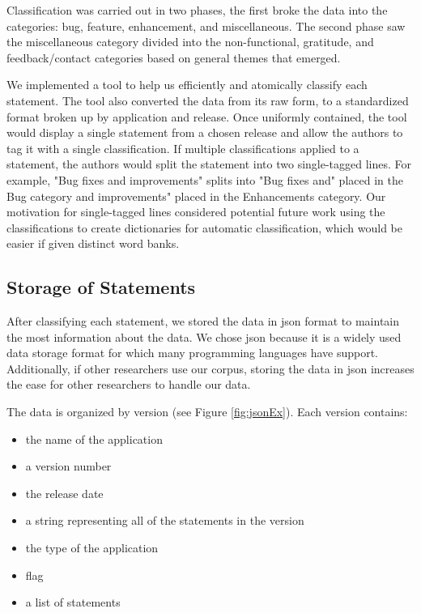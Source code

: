 \documentclass{acm_proc_article-sp}
\begin{document}
Classification was carried out in two phases, the first broke the data into the categories: bug, feature, enhancement, and miscellaneous.
The second phase saw the miscellaneous category divided into the non-functional, gratitude, and feedback/contact categories based on general themes that emerged.

We implemented a tool to help us efficiently and atomically classify each statement.
The tool also converted the data from its raw form, to a standardized format broken up by application and release.
Once uniformly contained, the tool would display a single statement from a chosen release and allow the authors to tag it with a single classification. 
If multiple classifications applied to a statement, the authors would split the statement into two single-tagged lines.
For example, "Bug fixes and improvements" splits into "Bug fixes and" placed in the Bug category and improvements" placed in the Enhancements category.
Our motivation for single-tagged lines considered potential future work using the classifications to create dictionaries for automatic classification, which would be easier if given distinct word banks.



\subsection{Storage of Statements}
After classifying each statement, we stored the data in json format to maintain the most information about the data.
We chose json because it is a widely used data storage format for which many programming languages have support. 
Additionally, if other researchers use our corpus, storing the data in json increases the ease for other researchers to handle our data.

The data is organized by version (see Figure \ref{fig:jsonEx}). Each version contains: 
\begin{itemize}
	\item the name of the application
	\item a version number
	\item the release date
	\item a string representing all of the statements in the version
	\item the type of the application
	\item flag
	\item a list of statements
\end{itemize}
\end{document}
